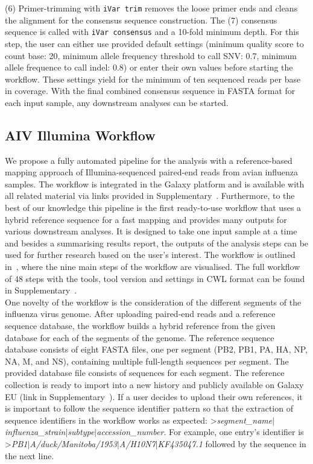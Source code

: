 (6) Primer-trimming with \texttt{iVar trim} removes the loose primer ends and cleans the alignment for the consensus sequence construction. The (7) consensus sequence is called with \texttt{iVar consensus} and a 10-fold minimum depth. For this step, the user can either use provided default settings (minimum quality score to count base: 20, minimum allele frequency threshold to call SNV: 0.7, minimum allele frequence to call indel: 0.8) or enter their own values before starting the workflow. These settings yield for the minimum of ten sequenced reads per base in coverage. With the final combined consensus sequence in FASTA format for each input sample, any downstream analyses can be started. \\

\subsection{AIV Illumina Workflow}\label{sec:aiv-wf}
We propose a fully automated pipeline for the analysis with a reference-based mapping approach of Illumina-sequenced paired-end reads from avian influenza samples. The workflow is integrated in the Galaxy platform and is available with all related material via links provided in Supplementary~. Furthermore, to the best of our knowledge this pipeline is the first ready-to-use workflow that uses a hybrid reference sequence for a fast mapping and provides many outputs for various downstream analyses. It is designed to take one input sample at a time and besides a summarising results report, the outputs of the analysis steps can be used for further research based on the user's interest. The workflow is outlined in~, where the nine main steps of the workflow are visualised. The full workflow of 48 steps with the tools, tool version and settings in \ac{CWL} format  can be found in Supplementary~. \\
One novelty of the workflow is the consideration of the different segments of the influenza virus genome. After uploading paired-end reads and a reference sequence database, the workflow builds a hybrid reference from the given database for each of the segments of the genome. The reference sequence database consists of eight FASTA files, one per segment (PB2, PB1, PA, HA, NP, NA, M, and NS), containing multiple full-length sequences per segment. The provided database file consists of  sequences for each segment. The reference collection is ready to import into a new history and publicly available on Galaxy EU (link in Supplementary~). If a user decides to upload their own references, it is important to follow the sequence identifier pattern so that the extraction of sequence identifiers in the workflow works as expected: >\textit{segment\_name$\mid$influenza\_strain$\mid$subtype$\mid$accession\_number}. For example, one entry's identifier is >\textit{PB1$\mid$A/duck/Manitoba/1953$\mid$A/H10N7$\mid$KF435047.1} followed by the sequence in the next line. 

